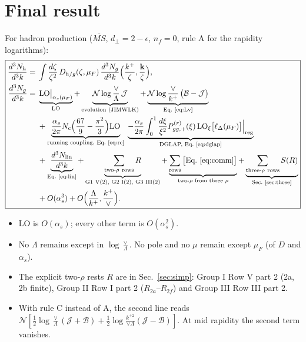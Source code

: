 \documentclass[10pt]{article}
\numberwithin{equation}{section}
\newcommand{\JJ}{\mathcal J}
\newcommand{\BB}{\mathcal B}
\newcommand{\NN}{\mathcal N}
\newcommand{\LOx}[1]{{\rm LO}_\xi\big[#1\big]}
\begin{document}
\section{Final result}\label{sec:final}
For hadron production ($\overline{MS}$, $d_\perp=2-\epsilon$, $n_f=0$, rule A for the rapidity logarithms):
\begin{equation}
\boxed{\begin{aligned}
\frac{d^3N_h}{d^3k}={}&\int\frac{d\zeta}{\zeta^2}\,D_{h/g}(\zeta,\mu_F)\,\frac{d^3N_g}{d^3k}\Big(\frac{k^+}{\zeta},\frac{\mathbf k}{\zeta}\Big),\\
\frac{d^3N_g}{d^3k}={}&\underbrace{{\rm LO}\big|_{\alpha_s(\mu_F)}}_{\text{LO}}+\underbrace{\NN\log\frac{\vee}{\Lambda}\,\JJ}_{\text{evolution (JIMWLK)}}+\underbrace{\NN\log\frac{\vee}{k^+}\,\big(\BB-\JJ\big)}_{\text{Eq.~\eqref{eq:Lv}}}\\
&+\underbrace{\frac{\alpha_s}{2\pi}N_c\Big(\frac{67}{9}-\frac{\pi^2}{3}\Big){\rm LO}}_{\text{running coupling, Eq.~\eqref{eq:rc}}}\;\underbrace{-\frac{\alpha_s}{2\pi}\int_0^1\frac{d\xi}{\xi^2}P^{(r)}_{gg,+}(\xi)\,\LOx{\ell_\Delta(\mu_F)}\Big|_{\rm reg}}_{\text{DGLAP, Eq.~\eqref{eq:dglap}}}\\
&+\underbrace{\frac{d^3N_{\rm lin}}{d^3k}}_{\text{Eq.~\eqref{eq:lin}}}+\underbrace{\sum_{\rm two\text{-}\rho\ rows}R}_{\text{G1 V(2), G2 I(2), G3 III(2)}}+\underbrace{\sum_{\rm rows}\big[\text{Eq.~\eqref{eq:comm}}\big]}_{\text{two-}\rho\text{ from three }\rho}+\underbrace{\sum_{\rm three\text{-}\rho\ rows}S(R)}_{\text{Sec.~\ref{sec:three}}}\\
&+O(\alpha_s^3)+O\Big(\frac{\Lambda}{k^+},\frac{k^+}{\vee}\Big).
\end{aligned}}
\label{eq:final}
\end{equation}
\begin{itemize}
\item LO is $O(\alpha_s)$; every other term is $O(\alpha_s^2)$.
\item No $\Lambda$ remains except in $\log\frac{\vee}{\Lambda}$. No pole and no $\mu$ remain except $\mu_F$ (of $D$ and $\alpha_s$).
\item The explicit two-$\rho$ rests $R$ are in Sec.~\ref{sec:simp}: Group I Row V part 2 (2a, 2b finite), Group II Row I part 2 ($R_{2a}$--$R_{2f}$) and Group III Row III part 2.
\item With rule C instead of A, the second line reads $\NN[\frac12\log\frac\vee\Lambda(\JJ+\BB)+\frac12\log\frac{k^{+2}}{\vee\Lambda}(\JJ-\BB)]$. At mid rapidity the second term vanishes.
\end{itemize}
\end{document}
